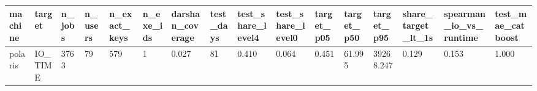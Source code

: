 \begin{tabular}{llllllllllllllll}
\toprule
machine & target & n_jobs & n_users & n_exact_keys & n_exe_ids & darshan_coverage & test_days & test_share_level4 & test_share_level0 & target_p05 & target_p50 & target_p95 & share_target_lt_1s & spearman_io_vs_runtime & test_mae_catboost \\
\midrule
polaris & IO_TIME & 3763 & 79 & 579 & 1 & 0.027 & 81 & 0.410 & 0.064 & 0.451 & 61.995 & 39268.247 & 0.129 & 0.153 & 1.000 \\
\bottomrule
\end{tabular}
